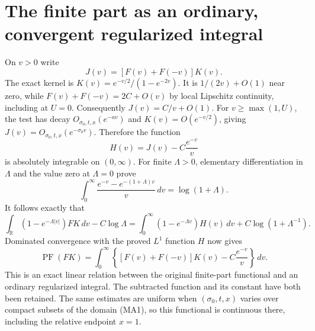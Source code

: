 \documentclass[11pt]{article}
\newcommand{\R}{\mathbb R}\newcommand{\C}{\mathbb C}
\newcommand{\PF}{\operatorname{PF}}\newcommand{\dd}{\,d}
\begin{document}
\section{The finite part as an ordinary, convergent regularized integral}
On $v>0$ write
\[
 J(v)=[F(v)+F(-v)]K(v).
\]
The exact kernel is $K(v)=e^{-v/2}/(1-e^{-2v})$.
It is $1/(2v)+O(1)$ near zero, while
$F(v)+F(-v)=2C+O(v)$ by local Lipschitz continuity, including at $U=0$.
Consequently $J(v)=C/v+O(1)$. For $v\ge\max(1,U)$, the test has decay
$O_{\sigma_0,t,x}(e^{-av})$ and $K(v)=O(e^{-v/2})$, giving
$J(v)=O_{\sigma_0,t,x}(e^{-\sigma_0v})$.
Therefore the function
\begin{equation}\tag{MA5}
 H(v)=J(v)-C\frac{e^{-v}}v
\end{equation}
is absolutely integrable on $(0,\infty)$.
For finite $\Lambda>0$, elementary differentiation in $\Lambda$ and the
value zero at $\Lambda=0$ prove
\[
 \int_0^\infty\frac{e^{-v}-e^{-(1+\Lambda)v}}v\dd v=\log(1+\Lambda).
\]
It follows exactly that
\begin{equation}\tag{MA6}
 \int_\R(1-e^{-\Lambda|v|})FK\dd v-C\log\Lambda
 =\int_0^\infty(1-e^{-\Lambda v})H(v)\dd v
  +C\log(1+\Lambda^{-1}).
\end{equation}
Dominated convergence with the proved $L^1$ function $H$ now gives
\begin{equation}\tag{MA7}
 \boxed{\PF(FK)=\int_0^\infty
 \left\{[F(v)+F(-v)]K(v)-C\frac{e^{-v}}v\right\}\dd v.}
\end{equation}
This is an exact linear relation between the original finite-part functional
and an ordinary regularized integral. The subtracted function and its
constant have both been retained. The same estimates are uniform when
$(\sigma_0,t,x)$ varies over compact subsets of the domain (MA1), so this
functional is continuous there, including the relative endpoint $x=1$.
\end{document}
